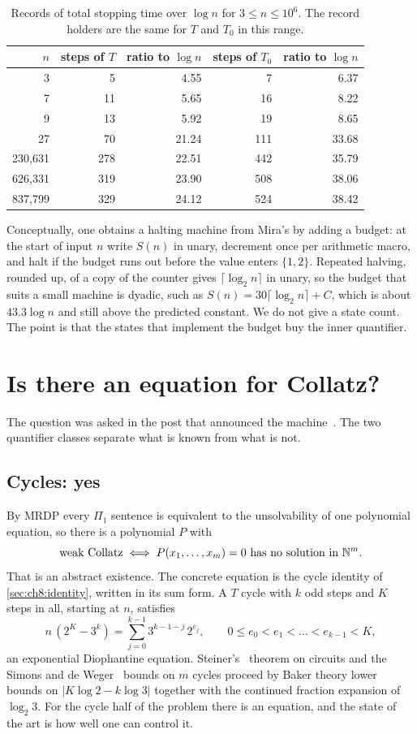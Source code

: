 \begin{table}[t]
\centering
\begin{tabular}{rrrrr}
\toprule
$n$ & steps of $T$ & ratio to $\log n$ & steps of $T_0$ & ratio to $\log n$ \\
\midrule
3 & 5 & 4.55 & 7 & 6.37 \\
7 & 11 & 5.65 & 16 & 8.22 \\
9 & 13 & 5.92 & 19 & 8.65 \\
27 & 70 & 21.24 & 111 & 33.68 \\
230{,}631 & 278 & 22.51 & 442 & 35.79 \\
626{,}331 & 319 & 23.90 & 508 & 38.06 \\
837{,}799 & 329 & 24.12 & 524 & 38.42 \\
\bottomrule
\end{tabular}
\caption{Records of total stopping time over $\log n$ for $3\le n\le10^6$. The record holders are the same for $T$ and $T_0$ in this range.}
\label{tab:ch21:records}
\end{table}

Conceptually, one obtains a halting machine from Mira's by adding a budget: at the start of input $n$ write $S(n)$ in unary, decrement once per arithmetic macro, and halt if the budget runs out before the value enters $\{1,2\}$. Repeated halving, rounded up, of a copy of the counter gives $\lceil\log_2n\rceil$ in unary, so the budget that suits a small machine is dyadic, such as $S(n)=30\lceil\log_2n\rceil+C$, which is about $43.3\log n$ and still above the predicted constant. We do not give a state count. The point is that the states that implement the budget buy the inner quantifier.

\section{Is there an equation for Collatz?}\label{sec:ch21:equation}

The question was asked in the post that announced the machine~\cite{mira2026}. The two quantifier classes separate what is known from what is not.

\subsection{Cycles: yes}

By MRDP every $\Pi_1$ sentence is equivalent to the unsolvability of one polynomial equation, so there is a polynomial $P$ with
\[
\text{weak Collatz} \iff P(x_1,\dots,x_m)=0 \text{ has no solution in } \mathbb{N}^m .
\]
That is an abstract existence. The concrete equation is the cycle identity of \cref{sec:ch8:identity}, written in its sum form. A $T$ cycle with $k$ odd steps and $K$ steps in all, starting at $n$, satisfies
\[
n\,(2^{K}-3^{k}) = \sum_{j=0}^{k-1} 3^{k-1-j}\,2^{e_j},
\qquad 0\le e_0<e_1<\dots<e_{k-1}<K,
\]
an exponential Diophantine equation. Steiner's~\cite{steiner1977} theorem on circuits and the Simons and de Weger~\cite{simons2005} bounds on $m$ cycles proceed by Baker theory lower bounds on $|K\log 2-k\log 3|$ together with the continued fraction expansion of $\log_2 3$. For the cycle half of the problem there is an equation, and the state of the art is how well one can control it.

